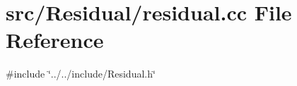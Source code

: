 \section{src/\+Residual/residual.cc File Reference}
\label{residual_8cc}
{\ttfamily \#include \char`\"{}../../include/\+Residual.\+h\char`\"{}}\newline
